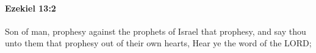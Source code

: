 
		\paragraph{Ezekiel 13:2} %
			\label{EZEKIEL-13-2}

			Son of man, prophesy against the prophets of Israel that prophesy, and say thou unto them that prophesy out of their own hearts, Hear ye the word of the LORD;


